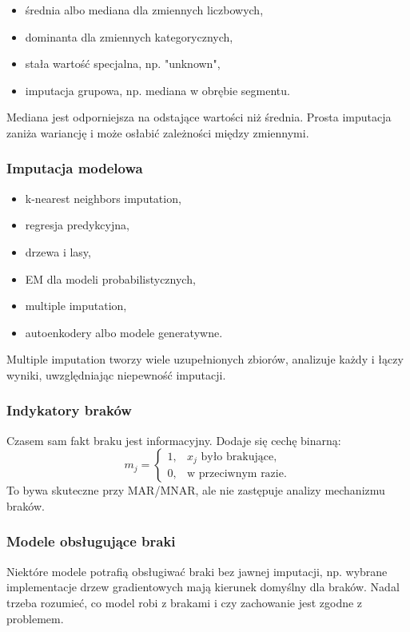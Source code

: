\begin{itemize}
  \item średnia albo mediana dla zmiennych liczbowych,
  \item dominanta dla zmiennych kategorycznych,
  \item stała wartość specjalna, np. "unknown",
  \item imputacja grupowa, np. mediana w obrębie segmentu.
\end{itemize}

Mediana jest odporniejsza na odstające wartości niż średnia. Prosta imputacja zaniża wariancję i może osłabić zależności między zmiennymi.

\subsubsection{Imputacja modelowa}

\begin{itemize}
  \item k-nearest neighbors imputation,
  \item regresja predykcyjna,
  \item drzewa i lasy,
  \item EM dla modeli probabilistycznych,
  \item multiple imputation,
  \item autoenkodery albo modele generatywne.
\end{itemize}

Multiple imputation tworzy wiele uzupełnionych zbiorów, analizuje każdy i łączy wyniki, uwzględniając niepewność imputacji.

\subsubsection{Indykatory braków}

Czasem sam fakt braku jest informacyjny. Dodaje się cechę binarną:
\[
m_j =
\begin{cases}
1, & x_j\text{ było brakujące},\\
0, & \text{w przeciwnym razie}.
\end{cases}
\]
To bywa skuteczne przy MAR/MNAR, ale nie zastępuje analizy mechanizmu braków.

\subsubsection{Modele obsługujące braki}

Niektóre modele potrafią obsługiwać braki bez jawnej imputacji, np. wybrane implementacje drzew gradientowych mają kierunek domyślny dla braków. Nadal trzeba rozumieć, co model robi z brakami i czy zachowanie jest zgodne z problemem.

